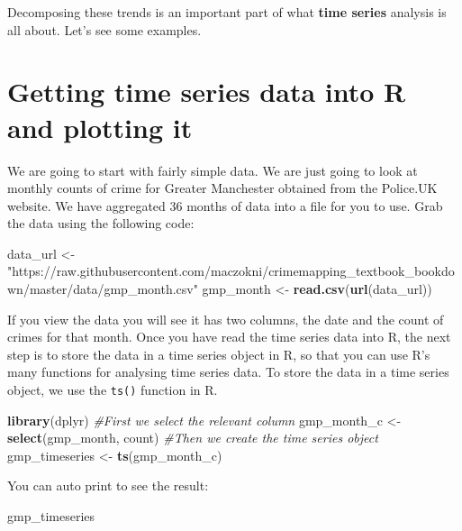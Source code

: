 \documentclass[]{book}
\newenvironment{Shaded}{\begin{snugshade}}{\end{snugshade}}
\newcommand{\CommentTok}[1]{\textcolor[rgb]{0.56,0.35,0.01}{\textit{#1}}}
\newcommand{\KeywordTok}[1]{\textcolor[rgb]{0.13,0.29,0.53}{\textbf{#1}}}
\newcommand{\NormalTok}[1]{#1}
\newcommand{\StringTok}[1]{\textcolor[rgb]{0.31,0.60,0.02}{#1}}
\begin{document}
Decomposing these trends is an important part of what \textbf{time series} analysis is all about. Let's see some examples.

\hypertarget{getting-time-series-data-into-r-and-plotting-it}{%
\section{Getting time series data into R and plotting it}\label{getting-time-series-data-into-r-and-plotting-it}}

We are going to start with fairly simple data. We are just going to look at monthly counts of crime for Greater Manchester obtained from the Police.UK website. We have aggregated 36 months of data into a file for you to use. Grab the data using the following code:

\begin{Shaded}
\begin{Highlighting}[]
\NormalTok{data_url <-}\StringTok{"https://raw.githubusercontent.com/maczokni/crimemapping_textbook_bookdown/master/data/gmp_month.csv"}
\NormalTok{gmp_month <-}\StringTok{ }\KeywordTok{read.csv}\NormalTok{(}\KeywordTok{url}\NormalTok{(data_url))}
\end{Highlighting}
\end{Shaded}

If you view the data you will see it has two columns, the date and the count of crimes for that month. Once you have read the time series data into R, the next step is to store the data in a time series object in R, so that you can use R's many functions for analysing time series data. To store the data in a time series object, we use the \texttt{ts()} function in R.

\begin{Shaded}
\begin{Highlighting}[]
\KeywordTok{library}\NormalTok{(dplyr)}
\CommentTok{#First we select the relevant column}
\NormalTok{gmp_month_c <-}\StringTok{ }\KeywordTok{select}\NormalTok{(gmp_month, count)}
\CommentTok{#Then we create the time series object}
\NormalTok{gmp_timeseries <-}\StringTok{ }\KeywordTok{ts}\NormalTok{(gmp_month_c)}
\end{Highlighting}
\end{Shaded}

You can auto print to see the result:

\begin{Shaded}
\begin{Highlighting}[]
\NormalTok{gmp_timeseries}
\end{Highlighting}
\end{Shaded}
\end{document}
